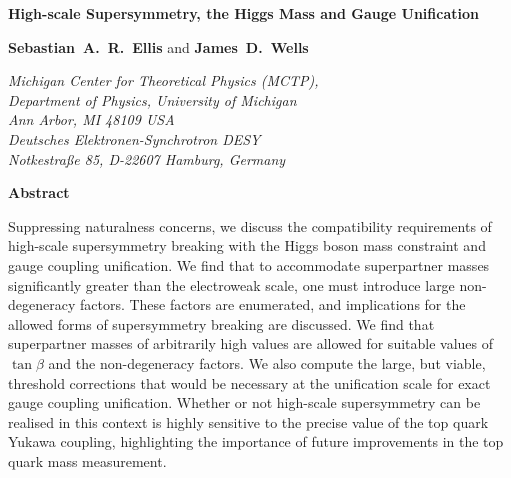 \documentclass[12pt]{article}
\begin{document}
\begin{titlepage}

\pagestyle{empty}

\baselineskip=21pt
\vskip 0.6in

\begin{center}


{\large {\bf High-scale Supersymmetry, the Higgs Mass and Gauge Unification}}


\vskip 0.4in

 {\bf Sebastian~A.~R.~Ellis} and 
 {\bf James~D.~Wells}


\vskip 0.3in

{\small {\it
{Michigan Center for Theoretical Physics (MCTP), \\ Department of Physics, University of Michigan \\Ann Arbor, MI 48109 USA}\\
\vspace{0.25cm}
{Deutsches Elektronen-Synchrotron DESY}\\ \it{Notkestra\ss e 85, D-22607 Hamburg, Germany}}}

\vskip 0.5in

{\bf Abstract}

\end{center}

\baselineskip=18pt \noindent


{\small

Suppressing naturalness concerns, we discuss the compatibility requirements of high-scale supersymmetry breaking with the Higgs boson mass constraint and gauge coupling unification. We find that to accommodate superpartner masses significantly greater than the electroweak scale, one must introduce large non-degeneracy factors. These factors are enumerated, and implications for the allowed forms of supersymmetry breaking are discussed. We find that superpartner masses of arbitrarily high values are allowed for suitable values of $\tan\beta$ and the non-degeneracy factors. We also compute the large, but viable, threshold corrections that would be necessary at the unification scale for exact gauge coupling unification. Whether or not high-scale supersymmetry can be realised in this context is highly sensitive to the precise value of the top quark Yukawa coupling, highlighting the importance of future improvements in the top quark mass measurement.
}


\vskip 0.5in

{\small {}}



\end{titlepage}
\end{document}

